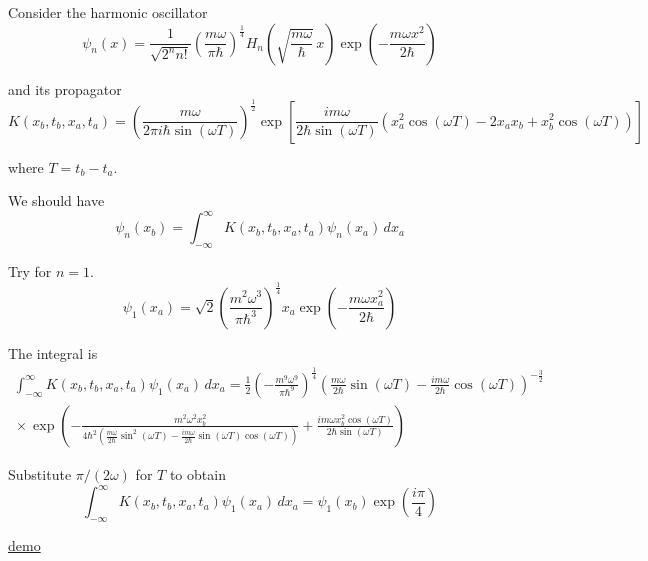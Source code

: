 

Consider the harmonic oscillator
\begin{equation*}
\psi_n(x)=\frac{1}{\sqrt{2^nn!}}\left(\frac{m\omega}{\pi\hbar}\right)^\frac{1}{4}
H_n\left(\sqrt{\frac{m\omega}{\hbar}}\,x\right)
\exp\left(-\frac{m\omega x^2}{2\hbar}\right)
\end{equation*}

and its propagator
\begin{equation*}
K(x_b,t_b,x_a,t_a)
=\left(\frac{m\omega}{2\pi i\hbar\sin(\omega T)}\right)^\frac{1}{2}
\exp\left[
\frac{im\omega}{2\hbar\sin(\omega T)}
\left(x_a^2\cos(\omega T)-2x_ax_b+x_b^2\cos(\omega T)\right)
\right]
\end{equation*}

where $T=t_b-t_a$.

\bigskip
We should have
\begin{equation*}
\psi_n(x_b)=\int_{-\infty}^\infty K(x_b,t_b,x_a,t_a)\psi_n(x_a)\,dx_a
\end{equation*}

Try for $n=1$.
\begin{equation*}
\psi_1(x_a)=\sqrt2\left(\frac{m^2\omega^3}{\pi\hbar^3}\right)^\frac{1}{4}
x_a\exp\left(-\frac{m\omega x_a^2}{2\hbar}\right)
\end{equation*}

The integral is
\begin{multline*}
\int_{-\infty}^\infty K(x_b,t_b,x_a,t_a)\psi_1(x_a)\,dx_a
=\frac{1}{2}\left(-\frac{m^9\omega^9}{\pi\hbar^9}\right)^\frac{1}{4}
\left(\frac{m\omega}{2\hbar}\sin(\omega T)
-\frac{im\omega}{2\hbar}\cos(\omega T)\right)^{-\frac{3}{2}}
\\{}\times
\exp\left(
-\frac{m^2\omega^2x_b^2}
{4\hbar^2\left(\frac{m\omega}{2\hbar}\sin^2(\omega T)
-\frac{im\omega}{2\hbar}\sin(\omega T)\cos(\omega T)\right)}
+\frac{im\omega x_b^2\cos(\omega T)}{2\hbar\sin(\omega T)}
\right)
\end{multline*}

Substitute $\pi/(2\omega)$ for $T$ to obtain
\begin{equation*}
\int_{-\infty}^\infty K(x_b,t_b,x_a,t_a)\psi_1(x_a)\,dx_a
=\psi_1(x_b)\exp\left(\frac{i\pi}{4}\right)
\end{equation*}

\href{https://georgeweigt.github.io/blog/10.html}{demo}

